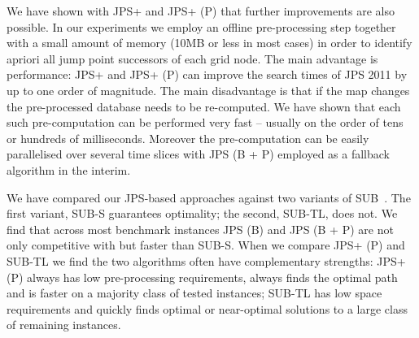 We have shown with JPS+ and JPS+ (P) that further improvements are also possible. 
In our experiments we employ an offline pre-processing step together with a small 
amount of memory (10MB or less in most cases) in order to identify apriori all jump 
point successors of each grid node.
The main advantage is performance: JPS+ and JPS+ (P) can improve the search times of 
JPS 2011 by up to one order of magnitude.
The main disadvantage is that if the map changes the pre-processed
database needs to be re-computed. We have shown that each such pre-computation
can be performed very fast -- usually on the order of tens or hundreds of 
milliseconds. Moreover the pre-computation can be easily parallelised over
several time slices with JPS (B + P) employed as a fallback algorithm in
the interim.

We have compared our JPS-based approaches against two variants of SUB~\cite{urasKH13}.
The first variant, SUB-S guarantees optimality; the second, SUB-TL, does not. 
We find that across most benchmark instances JPS (B) and 
JPS (B + P) are not only competitive with but faster than SUB-S. When we compare
JPS+ (P) and SUB-TL we find the two algorithms often have complementary strengths:
JPS+ (P) always has low pre-processing requirements, always finds the optimal path
and is faster on a majority class of tested instances; SUB-TL has low space
requirements and quickly finds optimal or near-optimal solutions to a large class 
of remaining instances.

